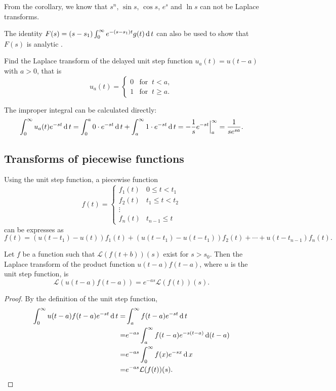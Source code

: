 From the corollary, we know that $s^n$, $\sin s$, $\cos s$, $e^s$ and $\ln s$ can not be Laplace transforms.

\begin{remark}
  The identity $F(s)=(s-s_{1})\int_{0}^{\infty }e^{-(s-s_{1})t}g(t)\operatorname{d} t$ can also be used to show that $F(s)$ is analytic \autocite[see, for example,][Chapter 6]{Doetsch1974}. 
\end{remark}


\begin{example}
  Find the Laplace transform of the delayed unit step function $u_a(t)=u(t-a)$ with $a>0$, that is
  \[
    u_a(t)=\begin{cases}
    0 & \text{for }~ t<a,\\
    1 & \text{for }~ t\ge a.
  \end{cases}
  \]
\end{example}

\begin{solution}
  The improper integral can be calculated directly:
  \[
    \int_0^\infty u_a(t)e^{-st}\operatorname{d} t=\int_0^a 0\cdot e^{-st}\operatorname{d} t+\int_a^\infty 1\cdot e^{-st}\operatorname{d} t=-\frac1s e^{-st}\Big|_a^\infty=\frac{1}{se^{sa}}.
  \]
\end{solution}

\subsection*{Transforms of piecewise functions}

Using the unit step function, a piecewise function
\[
f(t)=\begin{cases}
  f_1(t) & 0\le t <t_1\\
  f_2(t) & t_1\le t <t_2\\
  \vdots\\
  f_n(t) & t_{n-1}\le t
\end{cases}  
\]
can be expresses as
\[f(t)=(u(t-t_1)-u(t))f_1(t)+(u(t-t_1)-u(t-t_1))f_2(t)+\cdots + u(t-t_{n-1})f_n(t).\]

\begin{theorem}
  Let $f$ be a function such that $\mathcal{L}(f(t+b))(s)$ exist for $s>s_0$. Then the Laplace transform of the product function $u(t-a)f(t-a)$, where $u$ is the unit step function, is
  \[\mathcal{L}(u(t-a)f(t-a))=e^{-as}\mathcal{L}(f(t))(s).\]
\end{theorem}
\begin{proof}
  By the definition of the unit step function,
  \[
    \begin{aligned}
      \int_0^\infty u(t-a)f(t-a)e^{-st}\operatorname{d} t=&\int_a^\infty f(t-a)e^{-st}\operatorname{d} t\\
      =&e^{-as}\int_a^\infty f(t-a)e^{-s(t-a)}\operatorname{d} (t-a)\\
      =&e^{-as}\int_0^\infty f(x)e^{-sx}\operatorname{d} x\\
      =&e^{-as}\mathcal{L}(f(t))(s).
    \end{aligned}
    \]
\end{proof}

